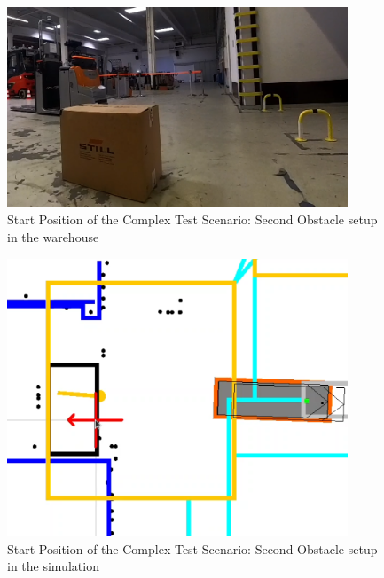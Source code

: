 \begin{figure}[H]
    \begin{center}
        \includegraphics[width=4in]{images/Chap3/Test3/Start_real.png} %
        \caption{Start Position of the Complex Test Scenario: Second Obstacle setup in the warehouse}
        \label{OptResult18}
        \end{center}    
\end{figure}

\begin{figure}[H]
    \begin{center}
        \includegraphics[width=4in]{images/Chap3/Test3/Start_simu.png} %
        \caption{Start Position of the Complex Test Scenario: Second Obstacle setup in the simulation}
        \label{OptResult19}
        \end{center}    
\end{figure}


